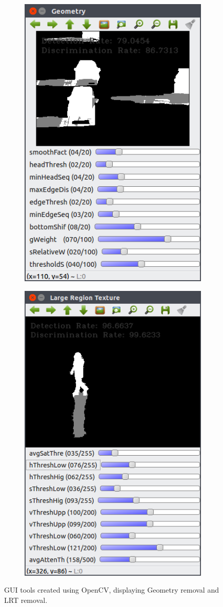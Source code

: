 \documentclass[12pt]{report}
\begin{document}
\begin{figure}
\centering
\begin{subfigure}{.49\linewidth}
  \centering
  \includegraphics[width=.7\linewidth]{figures/geo_highway1_default.png}
\end{subfigure}
\hfill
\begin{subfigure}{.49\linewidth}
  \centering
  \includegraphics[width=.7\linewidth]{figures/lr_caviar_default.png}
\end{subfigure}
\caption{GUI tools created using OpenCV, displaying Geometry removal and LRT removal.}
\label{fig:guitools}
\end{figure}
\end{document}
